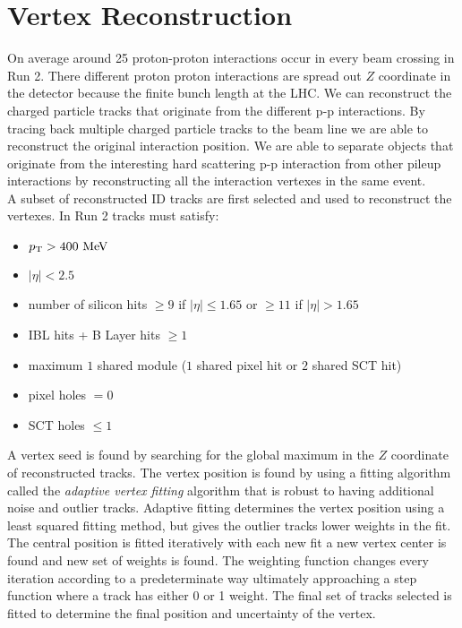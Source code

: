 \section{Vertex Reconstruction}
\label{sec:reco:vtx}

\indent On average around 25 proton-proton interactions occur in every beam crossing in Run 2.  There different proton proton interactions are spread out $Z$ coordinate in the detector because the finite bunch length at the LHC.  We can reconstruct the charged particle tracks that originate from the different p-p interactions.  By tracing back multiple charged particle tracks to the beam line we are able to reconstruct the original interaction position.  We are able to separate objects that originate from the interesting hard scattering p-p interaction from other pileup interactions by reconstructing all the interaction vertexes in the same event. \\

\indent A subset of reconstructed ID tracks are first selected and used to reconstruct the vertexes.  In Run 2 tracks must satisfy:

\begin{itemize}
\item[] $\pt > 400 \mev$
\item[] $|\eta| < 2.5$
\item[] number of silicon hits $ \ge 9$ if $|\eta| \le 1.65$ or $\ge 11$ if $|\eta| > 1.65$
\item[] IBL hits + B Layer hits $\ge 1$
\item[] maximum $1$ shared module ($1$ shared pixel hit or $2$ shared SCT hit)
\item[] pixel holes $= 0$
\item[] SCT holes $\le 1$
\end{itemize}

\indent A vertex seed is found by searching for the global maximum in the $Z$ coordinate of reconstructed tracks.  The vertex position is found by using a fitting algorithm called the {\it adaptive vertex fitting} algorithm \cite{VertexReco,adaptiveFitting} that is robust to having additional noise and outlier tracks.  Adaptive fitting determines the vertex position using a least squared fitting method, but gives the outlier tracks lower weights in the fit.  \\

\indent  The central position is fitted iteratively with each new fit a new vertex center is found and new set of weights is found.  The weighting function changes every iteration according to a predeterminate way ultimately approaching a step function where a track has either 0 or 1 weight.  The final set of tracks selected is fitted to determine the final position and uncertainty of the vertex. \\

